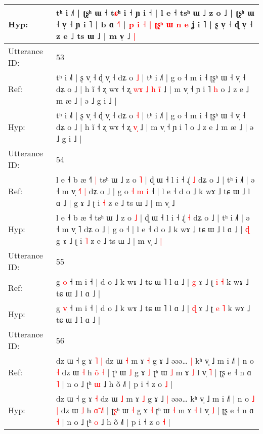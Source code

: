 \documentclass[10pt]{article}
\DeclareRobustCommand{\hl}[1]{{\textcolor{red}{#1}}}
\begin{document}
\begin{longtable}{ll}
 \\
Hyp: & tʰ i ˩˥ | ʈʂʰ ɯ ˧\hl{}\hl{} t\hl{ɕ}ʰ i ˧ ɲ i ˧ | l e ˧ tsʰ ɯ ˩ z o ˩ | ʈʂʰ ɯ ˧ v̩ ˧ ɲ i ˥ | b ɑ \hl{˧}˥ |\hl{ }\hl{p} \hl{i}\hl{ }\hl{˧} \hl{|} \hl{ʈ}\hl{ʂ}\hl{ʰ} \hl{ɯ} \hl{n} \hl{e} ʝ i ˥ | ʂ v̩ ˧ ɖ v̩ ˧ z e ˩ ts ɯ ˩ | m v̩ ˩\hl{ }\hl{|}
 \\
\midrule
Utterance ID: & 53 \\
Ref: & tʰ i ˩˥ | ʂ v̩ ˧ ɖ v̩ ˧ dʑ o \hl{˩} | tʰ i ˩˥ | g o ˧ m i ˧ ʈʂʰ ɯ ˧ v̩ ˧ dʑ o ˩ | h ĩ ˧ ʐ wɤ ˧ ʐ\hl{ }\hl{w}\hl{ɤ}\hl{ }\hl{˩}\hl{ }\hl{h} \hl{i}\hl{̃} ˩ | m v̩ ˧ ɲ i ˥\hl{ }\hl{h} o ˩ z e ˩ m æ ˩ | ə ˩ g i ˩ |
 \\
Hyp: & tʰ i ˩˥ | ʂ v̩ ˧ ɖ v̩ ˧ dʑ o \hl{˧} | tʰ i ˩˥ | g o ˧ m i ˧ ʈʂʰ ɯ ˧ v̩ ˧ dʑ o ˩ | h ĩ ˧ ʐ wɤ ˧ ʐ\hl{}\hl{}\hl{}\hl{}\hl{}\hl{}\hl{} \hl{v}\hl{̩} ˩ | m v̩ ˧ ɲ i ˥\hl{}\hl{} o ˩ z e ˩ m æ ˩ | ə ˩ g i ˩ |
 \\
\midrule
Utterance ID: & 54 \\
Ref: & l e ˧ b æ ˧\hl{˥}\hl{ }\hl{|} tsʰ ɯ ˩ z o \hl{˥} | ɖ ɯ ˧ l i ˧ ɻ̍ \hl{˩} dʑ o ˩ | tʰ i ˩˥ | ə ˧ m v̩ \hl{˧}˥\hl{ }\hl{|} dʑ o ˩ | g o\hl{ }\hl{˧}\hl{ }\hl{m}\hl{ }\hl{i} ˧ | l e ˧ d o ˩ k wɤ ˩ tɕ ɯ ˩ l ɑ ˩ |\hl{}\hl{} g ɤ ˩ ʈ i \hl{˧} z e ˩ ts ɯ ˩ | m v̩ ˩\hl{}\hl{}
 \\
Hyp: & l e ˧ b æ ˧\hl{}\hl{}\hl{} tsʰ ɯ ˩ z o \hl{˩} | ɖ ɯ ˧ l i ˧ ɻ̍ \hl{˧} dʑ o ˩ | tʰ i ˩˥ | ə ˧ m v̩ \hl{}˥\hl{}\hl{} dʑ o ˩ | g o\hl{}\hl{}\hl{}\hl{}\hl{}\hl{} ˧ | l e ˧ d o ˩ k wɤ ˩ tɕ ɯ ˩ l ɑ ˩ |\hl{ }\hl{ɖ} g ɤ ˩ ʈ i \hl{˥} z e ˩ ts ɯ ˩ | m v̩ ˩\hl{ }\hl{|}
 \\
\midrule
Utterance ID: & 55 \\
Ref: & g \hl{}\hl{o} ˧ m i ˧ | d o ˩ k wɤ ˩ tɕ ɯ ˥ l ɑ ˩ | \hl{g} ɤ ˩ ʈ \hl{i} \hl{˧} k wɤ ˩ tɕ ɯ ˩ l ɑ ˩ |
 \\
Hyp: & g \hl{v}\hl{̩} ˧ m i ˧ | d o ˩ k wɤ ˩ tɕ ɯ ˥ l ɑ ˩ | \hl{ɖ} ɤ ˩ ʈ \hl{e} \hl{˥} k wɤ ˩ tɕ ɯ ˩ l ɑ ˩ |
 \\
\midrule
Utterance ID: & 56 \\
Ref: & dz ɯ ˧ g ɤ\hl{ }\hl{˥} \hl{|} dz ɯ \hl{˧} m ɤ \hl{˧} g ɤ ˩\hl{}\hl{} əəə…\hl{ }\hl{|} kʰ v̩ ˩ m i ˩˥ | n o\hl{}\hl{} \hl{˧} dz ɯ \hl{˧} h \hl{o}̃ \hl{}\hl{˧} | ʈ\hl{}ʰ ɯ \hl{˩} g ɤ \hl{˩} ʈʰ ɯ \hl{˩} m ɤ \hl{˩} l v̩ \hl{˥} | ʈʂ e ˧ n ɑ \hl{˥} | n o ˩ ʈʰ \hl{ɯ} ˩ h õ ˩˥ | p i ˧ z o \hl{˩} |
 \\
Hyp: & dz ɯ ˧ g ɤ\hl{}\hl{} \hl{˧} dz ɯ \hl{˩} m ɤ \hl{˩} g ɤ ˩\hl{ }\hl{|} əəə…\hl{}\hl{} kʰ v̩ ˩ m i ˩˥ | n o\hl{ }\hl{˩} \hl{|} dz ɯ \hl{˩} h \hl{ɑ}̃ \hl{˩}\hl{˥} | ʈ\hl{ʂ}ʰ ɯ \hl{˧} g ɤ \hl{˧} ʈʰ ɯ \hl{˧} m ɤ \hl{˧} l v̩ \hl{˩} | ʈʂ e ˧ n ɑ \hl{˧} | n o ˩ ʈʰ \hl{o} ˩ h õ ˩˥ | p i ˧ z o \hl{˧} |

\end{longtable}
\end{document}
